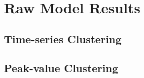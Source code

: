\section{Raw Model Results}

\subsection{Time-series Clustering}

 
 
 

\subsection{Peak-value Clustering}

